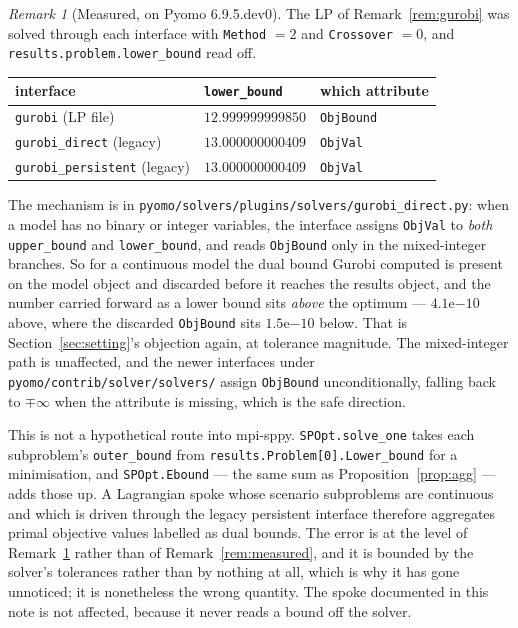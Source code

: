 \documentclass[11pt]{article}
\theoremstyle{plain}
\theoremstyle{remark}
\newtheorem{remark}[lemma]{Remark}
\begin{document}
\begin{remark}[Measured, on Pyomo 6.9.5.dev0]\label{rem:pyomo}
The LP of Remark~\ref{rem:gurobi} was solved through each interface with
\texttt{Method} $=2$ and \texttt{Crossover} $=0$, and
\texttt{results.problem.lower\_bound} read off.

\begin{center}
\begin{tabular}{lll}
\toprule
interface & \texttt{lower\_bound} & which attribute \\
\midrule
\texttt{gurobi} (LP file)           & $12.999999999850$ & \texttt{ObjBound} \\
\texttt{gurobi\_direct} (legacy)    & $13.000000000409$ & \texttt{ObjVal} \\
\texttt{gurobi\_persistent} (legacy)& $13.000000000409$ & \texttt{ObjVal} \\
\bottomrule
\end{tabular}
\end{center}

The mechanism is in \texttt{pyomo/solvers/plugins/solvers/gurobi\_direct.py}:
when a model has no binary or integer variables, the interface assigns
\texttt{ObjVal} to \emph{both} \texttt{upper\_bound} and
\texttt{lower\_bound}, and reads \texttt{ObjBound} only in the
mixed-integer branches.  So for a continuous model the dual bound Gurobi
computed is present on the model object and discarded before it reaches the
results object, and the number carried forward as a lower bound sits
\emph{above} the optimum --- $4.1\mathrm{e}{-10}$ above, where the discarded
\texttt{ObjBound} sits $1.5\mathrm{e}{-10}$ below.  That is
Section~\ref{sec:setting}'s objection again, at tolerance magnitude.  The
mixed-integer path is unaffected, and the newer interfaces under
\texttt{pyomo/contrib/solver/solvers/} assign \texttt{ObjBound}
unconditionally, falling back to $\mp\infty$ when the attribute is missing,
which is the safe direction.
\end{remark}

This is not a hypothetical route into mpi-sppy.  \texttt{SPOpt.solve\_one}
takes each subproblem's \texttt{outer\_bound} from
\texttt{results.Problem[0].Lower\_bound} for a minimisation, and
\texttt{SPOpt.Ebound} --- the same sum as Proposition~\ref{prop:agg} --- adds
those up.  A Lagrangian spoke whose scenario subproblems are continuous and
which is driven through the legacy persistent interface therefore aggregates
primal objective values labelled as dual bounds.  The error is at the level of
Remark~\ref{rem:pyomo} rather than of Remark~\ref{rem:measured}, and it is
bounded by the solver's tolerances rather than by nothing at all, which is why
it has gone unnoticed; it is nonetheless the wrong quantity.  The spoke
documented in this note is not affected, because it never reads a bound off
the solver.
\end{document}
